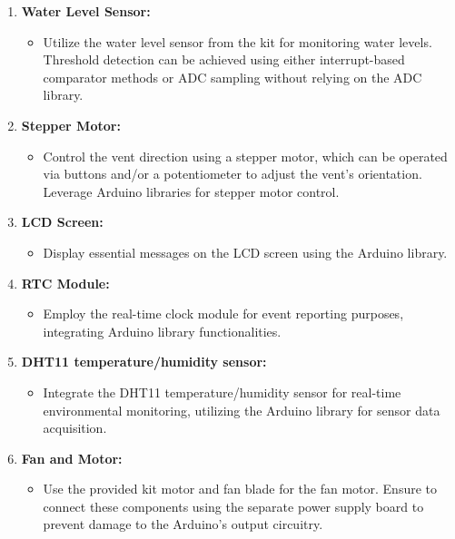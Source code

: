 \documentclass{article}
\begin{document}
\begin{enumerate}
    \item \textbf{Water Level Sensor:}
    \begin{itemize}
        \item Utilize the water level sensor from the kit for monitoring water levels. Threshold detection can be achieved using either interrupt-based comparator methods or ADC sampling without relying on the ADC library.
    \end{itemize}

    \item \textbf{Stepper Motor:}
    \begin{itemize}
        \item Control the vent direction using a stepper motor, which can be operated via buttons and/or a potentiometer to adjust the vent's orientation. Leverage Arduino libraries for stepper motor control.
    \end{itemize}

    \item \textbf{LCD Screen:}
    \begin{itemize}
        \item Display essential messages on the LCD screen using the Arduino library.
    \end{itemize}

    \item \textbf{RTC Module:}
    \begin{itemize}
        \item Employ the real-time clock module for event reporting purposes, integrating Arduino library functionalities.
    \end{itemize}

    \item \textbf{DHT11 temperature/humidity sensor:}
    \begin{itemize}
        \item Integrate the DHT11 temperature/humidity sensor for real-time environmental monitoring, utilizing the Arduino library for sensor data acquisition.
    \end{itemize}

    \item \textbf{Fan and Motor:}
    \begin{itemize}
        \item Use the provided kit motor and fan blade for the fan motor. Ensure to connect these components using the separate power supply board to prevent damage to the Arduino's output circuitry.
    \end{itemize}
\end{enumerate}
\end{document}
